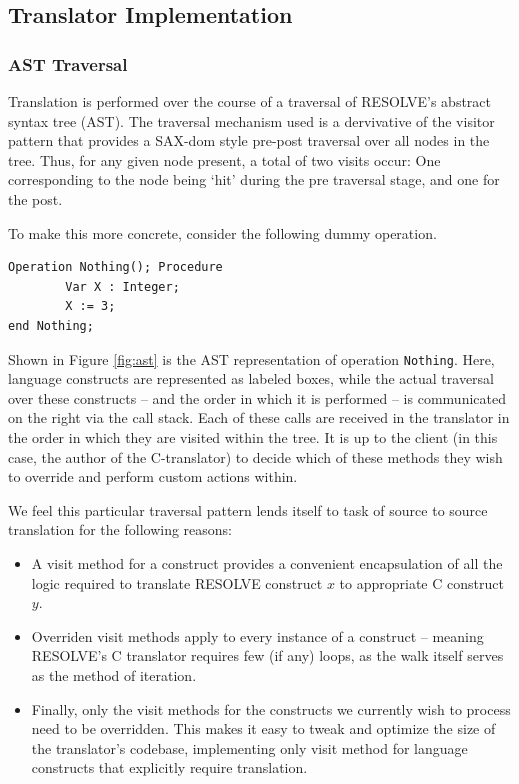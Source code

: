 \subsection{Translator Implementation}

\subsubsection{AST Traversal}
Translation is performed over the course of a traversal of RESOLVE's abstract syntax tree (AST). The traversal mechanism used is a dervivative of the visitor pattern that provides a SAX-dom style pre-post traversal over all nodes in the tree. Thus, for any given node present, a total of two visits occur: One corresponding to the node being `hit' during the pre traversal stage, and one for the post. 

To make this more concrete, consider the following dummy operation.

\begin{verbatim}
Operation Nothing(); Procedure
        Var X : Integer;
        X := 3;
end Nothing;
\end{verbatim}

Shown in Figure \ref{fig:ast} is the AST representation of operation \texttt{Nothing}. Here, language constructs are represented as labeled boxes, while the actual traversal over these constructs -- and the order in which it is performed -- is communicated on the right via the call stack. Each of these calls are received in the translator in the order in which they are visited within the tree. It is up to the client (in this case, the author of the C-translator) to decide which of these methods they wish to override and perform custom actions within. 

We feel this particular traversal pattern lends itself to task of source to source translation for the following reasons:

\begin{itemize}
\item A visit method for a construct provides a convenient encapsulation of all the logic required to translate RESOLVE construct $x$ to appropriate C construct $y$.

\item Overriden visit methods apply to every instance of a construct -- meaning RESOLVE's C translator requires few (if any) loops, as the walk itself serves as the method of iteration.

\item Finally, only the visit methods for the constructs we currently wish to process need to be overridden. This makes it easy to tweak and optimize the size of the translator's codebase, implementing only visit method for language constructs that explicitly require translation.  
\end{itemize}

